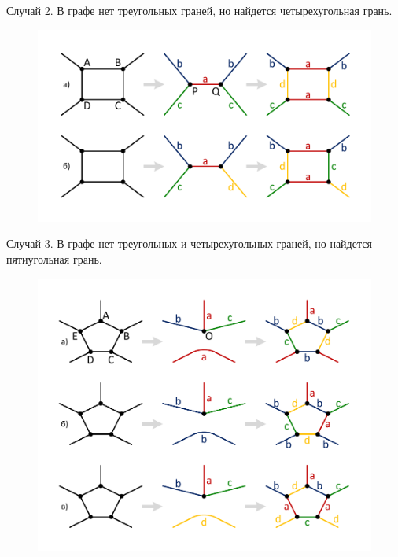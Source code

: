 Случай 2. В графе нет треугольных граней, но найдется четырехугольная грань.

\begin{figure}[ht]
	\centering
		\includegraphics[width=1.0\textwidth]{./pics/text_3_graph_prim/coloring4_face4.pdf}
	\caption{}
	\label{fig:text_3_graph_prim_coloring4_face4}
\end{figure}

Случай 3. В графе нет треугольных и четырехугольных граней, но найдется пятиугольная грань.

\begin{figure}[ht]
	\centering
		\includegraphics[width=1.0\textwidth]{./pics/text_3_graph_prim/coloring4_face5.pdf}
	\caption{}
	\label{fig:text_3_graph_prim_coloring4_face5}
\end{figure}

